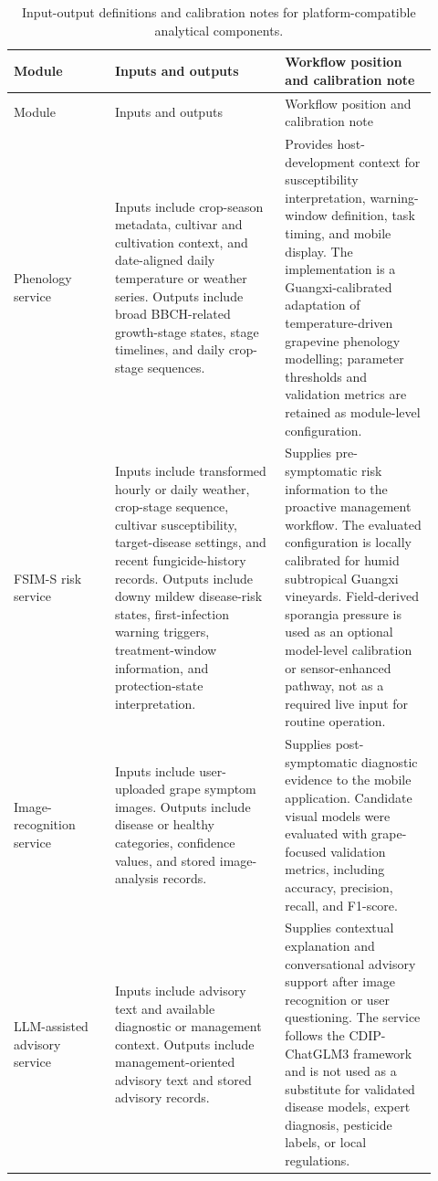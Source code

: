 \documentclass[12pt]{article}
\begin{document}
\begingroup
\setlength{\tabcolsep}{3pt}
\renewcommand{\arraystretch}{1.12}
\begin{longtable}{@{}L{0.22\linewidth} L{0.37\linewidth} L{0.33\linewidth}@{}}
\caption{Input-output definitions and calibration notes for platform-compatible analytical components.}\label{tab:supp_module_details}\\
\toprule
Module & Inputs and outputs & Workflow position and calibration note \\
\midrule
\endfirsthead
\toprule
Module & Inputs and outputs & Workflow position and calibration note \\
\midrule
\endhead
Phenology service & Inputs include crop-season metadata, cultivar and cultivation context, and date-aligned daily temperature or weather series. Outputs include broad BBCH-related growth-stage states, stage timelines, and daily crop-stage sequences. & Provides host-development context for susceptibility interpretation, warning-window definition, task timing, and mobile display. The implementation is a Guangxi-calibrated adaptation of temperature-driven grapevine phenology modelling; parameter thresholds and validation metrics are retained as module-level configuration. \\
FSIM-S risk service & Inputs include transformed hourly or daily weather, crop-stage sequence, cultivar susceptibility, target-disease settings, and recent fungicide-history records. Outputs include downy mildew disease-risk states, first-infection warning triggers, treatment-window information, and protection-state interpretation. & Supplies pre-symptomatic risk information to the proactive management workflow. The evaluated configuration is locally calibrated for humid subtropical Guangxi vineyards. Field-derived sporangia pressure is used as an optional model-level calibration or sensor-enhanced pathway, not as a required live input for routine operation. \\
Image-recognition service & Inputs include user-uploaded grape symptom images. Outputs include disease or healthy categories, confidence values, and stored image-analysis records. & Supplies post-symptomatic diagnostic evidence to the mobile application. Candidate visual models were evaluated with grape-focused validation metrics, including accuracy, precision, recall, and F1-score. \\
LLM-assisted advisory service & Inputs include advisory text and available diagnostic or management context. Outputs include management-oriented advisory text and stored advisory records. & Supplies contextual explanation and conversational advisory support after image recognition or user questioning. The service follows the CDIP-ChatGLM3 framework and is not used as a substitute for validated disease models, expert diagnosis, pesticide labels, or local regulations. \\
\bottomrule
\end{longtable}
\endgroup
\end{document}
